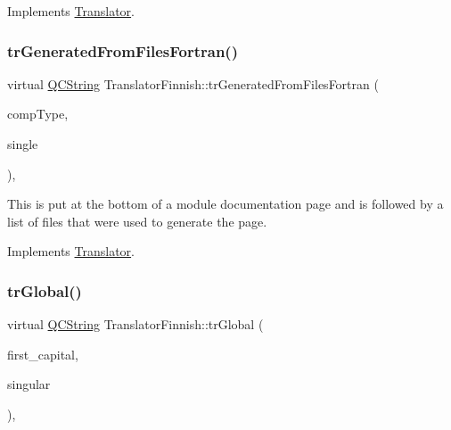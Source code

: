 Implements \mbox{\hyperlink{class_translator}{Translator}}.

\mbox{\label{class_translator_finnish_a93d2ec3af6d922013852869ebda85c55}} 
\subsubsection{\texorpdfstring{trGeneratedFromFilesFortran()}{trGeneratedFromFilesFortran()}}
{\footnotesize\ttfamily virtual \mbox{\hyperlink{class_q_c_string}{Q\+C\+String}} Translator\+Finnish\+::tr\+Generated\+From\+Files\+Fortran (\begin{DoxyParamCaption}\item[{\mbox{\hyperlink{class_class_def_ae70cf86d35fe954a94c566fbcfc87939}{Class\+Def\+::\+Compound\+Type}}}]{comp\+Type,  }\item[{bool}]{single }\end{DoxyParamCaption})\hspace{0.3cm}{\ttfamily [inline]}, {\ttfamily [virtual]}}

This is put at the bottom of a module documentation page and is followed by a list of files that were used to generate the page. 

Implements \mbox{\hyperlink{class_translator}{Translator}}.

\mbox{\label{class_translator_finnish_a8252511cdb04556410c98edcfa201956}} 
\subsubsection{\texorpdfstring{trGlobal()}{trGlobal()}}
{\footnotesize\ttfamily virtual \mbox{\hyperlink{class_q_c_string}{Q\+C\+String}} Translator\+Finnish\+::tr\+Global (\begin{DoxyParamCaption}\item[{bool}]{first\+\_\+capital,  }\item[{bool}]{singular }\end{DoxyParamCaption})\hspace{0.3cm}{\ttfamily [inline]}, {\ttfamily [virtual]}}

